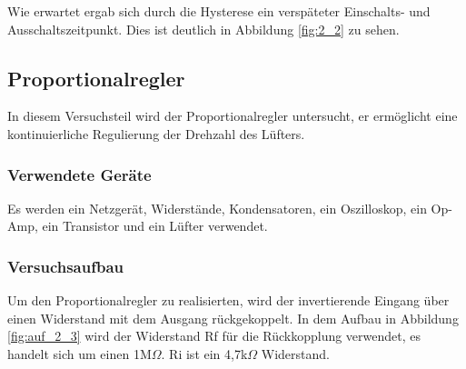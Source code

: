 \documentclass[12pt,a4paper]{article}
\begin{document}
Wie erwartet ergab sich durch die Hysterese ein verspäteter Einschalts- und Ausschaltszeitpunkt. Dies ist deutlich in Abbildung \ref{fig:2_2} zu sehen.

\subsection{Proportionalregler}

In diesem Versuchsteil wird der Proportionalregler untersucht, er ermöglicht eine kontinuierliche Regulierung der Drehzahl des Lüfters.

\subsubsection*{Verwendete Geräte}

Es werden ein Netzgerät, Widerstände, Kondensatoren, ein Oszilloskop, ein Op-Amp, ein Transistor und ein Lüfter verwendet.


\subsubsection*{Versuchsaufbau}

Um den Proportionalregler zu realisierten, wird der invertierende Eingang über einen Widerstand mit dem Ausgang rückgekoppelt. In dem Aufbau in Abbildung \ref{fig:auf_2_3} wird der Widerstand Rf für die Rückkopplung verwendet, es handelt sich um einen 1M$\Omega$. Ri ist ein 4,7k$\Omega$ Widerstand.
\end{document}
